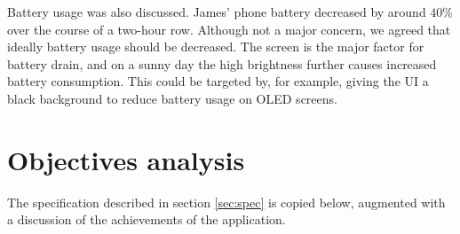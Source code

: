 \documentclass[11pt,twoside,a4paper]{report}
\begin{document}
Battery usage was also discussed. James' phone battery decreased by around $40\%$ over the course of a two-hour row. Although not a major concern, we agreed that ideally battery usage should be decreased. The screen is the major factor for battery drain, and on a sunny day the high brightness further causes increased battery consumption. This could be targeted by, for example, giving the UI a black background to reduce battery usage on OLED screens.

\section{Objectives analysis}

The specification described in section \ref{sec:spec} is copied below, augmented with a discussion of the achievements of the application.
\end{document}
